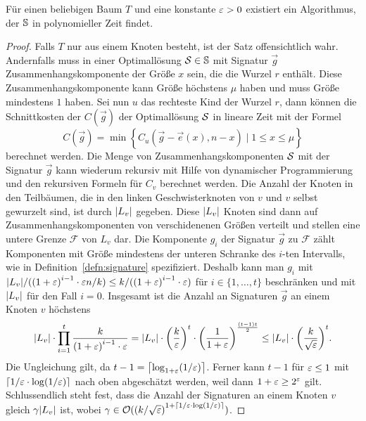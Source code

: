\begin{thm}\label{thm:cutphase}
    Für einen beliebigen Baum $T$ und eine konstante $\eps > 0$ existiert ein Algorithmus, der $\bbS$ in polynomieller Zeit findet.
\end{thm}
\begin{proof}
    Falls $T$ nur aus einem Knoten besteht, ist der Satz offensichtlich wahr.
    Andernfalls muss in einer Optimallösung $\calS \in \bbS$ mit Signatur $\vec{g}$ Zusammenhangskomponente der Größe $x$ sein, die die Wurzel $r$ enthält.
    Diese Zusammenhangskomponente kann Größe höchstens $\mu$ haben und muss Größe mindestens $1$ haben.
    Sei nun $u$ das rechteste Kind der Wurzel $r$, dann können die Schnittkosten der $C(\vec{g})$ der Optimallösung $\calS$ in lineare Zeit mit der Formel
    \begin{equation}\label{eq:root}
        C(\vec{g}) = \min \left\{ C_u(\vec{g} - \vec{e}(x), n - x) \mid 1 \leq x \leq \mu \right\}
    \end{equation}
    berechnet werden.
    Die Menge von Zusammenhangskomponenten $\calS$ mit der Signatur $\vec{g}$ kann wiederum rekursiv mit Hilfe von dynamischer Programmierung und den rekursiven Formeln für $C_v$ berechnet werden.
    Die Anzahl der Knoten in den Teilbäumen, die in den linken Geschwisterknoten von $v$ und $v$ selbst gewurzelt sind, ist durch $\card{L_v}$ gegeben.
    Diese $\card{L_v}$ Knoten sind dann auf Zusammenhangskomponenten von verschidenenen Größen verteilt und stellen eine untere Grenze $\mathcal{F}$ von $L_v$ dar.
    Die Komponente $g_i$ der Signatur $\vec{g}$ zu $\mathcal{F}$ zählt Komponenten mit Größe mindestens der unteren Schranke des $i$-ten Intervalls, wie in Definition~\ref{defn:signature} spezifiziert.
    Deshalb kann man $g_i$ mit $\card{L_v}/({(1 + \eps)}^{i - 1} \cdot \eps n/k) \leq k/({(1 + \eps)}^{i - 1} \cdot \eps)$ für $i \in \{1, \ldots, t\}$ beschränken und mit $\card{L_v}$ für den Fall $i = 0$.
    Insgesamt ist die Anzahl an Signaturen $\vec{g}$ an einem Knoten $v$ höchstens
    \begin{equation}\label{eq:sigcount}
        \card{L_v} \cdot \prod^t_{i=1} \frac{k}{{(1 + \eps)}^{i - 1} \cdot \eps} 
        = \card{L_v} \cdot {\left( \frac{k}{\eps} \right)}^t \cdot {\left( \frac{1}{1 + \eps} \right)}^{\frac{(t-1)t}{2}} 
        \leq \card{L_v} \cdot {\left( \frac{k}{\sqrt{\eps}} \right)}^t.
    \end{equation}
    Die Ungleichung gilt, da $t - 1 = \ceil*{\log_{1 + \eps}(1/\eps)}$. 
    Ferner kann $t - 1$ für $\eps \leq 1$ mit $\ceil*{1/\eps \cdot \log(1/\eps)}$ nach oben abgeschätzt werden, weil dann $1 + \eps \geq 2^\eps$ gilt.
    Schlussendlich steht fest, dass die Anzahl der Signaturen an einem Knoten $v$ gleich $\gamma \card{L_v}$ ist, wobei $\gamma \in \bigO({(k/\sqrt{\eps})}^{1 + \ceil{1/\eps \cdot \log(1/\eps)}})$.


\end{proof}
